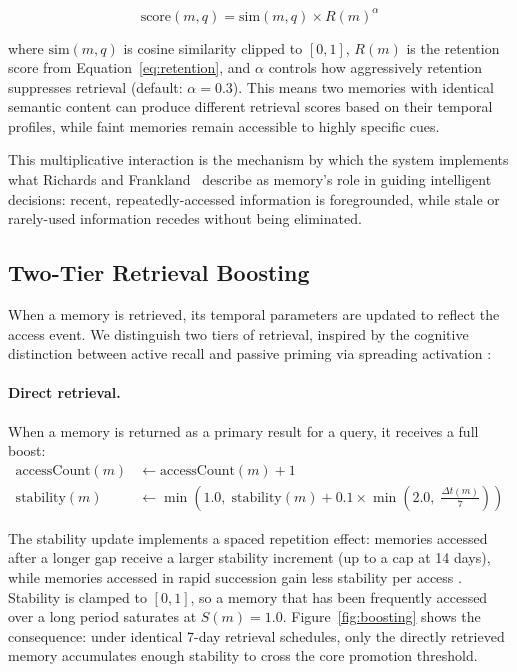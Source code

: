 \documentclass[11pt,a4paper]{article}
\begin{document}
\begin{equation}
\text{score}(m, q) = \text{sim}(m, q) \times R(m)^\alpha
\label{eq:score}
\end{equation}

\noindent where $\text{sim}(m, q)$ is cosine similarity clipped to $[0,1]$, $R(m)$ is the retention score from Equation~\ref{eq:retention}, and $\alpha$ controls how aggressively retention suppresses retrieval (default: $\alpha=0.3$). This means two memories with identical semantic content can produce different retrieval scores based on their temporal profiles, while faint memories remain accessible to highly specific cues.

This multiplicative interaction is the mechanism by which the system implements what Richards and Frankland~\citeyearpar{richards2017persistence} describe as memory's role in guiding intelligent decisions: recent, repeatedly-accessed information is foregrounded, while stale or rarely-used information recedes without being eliminated.

\subsection{Two-Tier Retrieval Boosting}
\label{sec:boost}

When a memory is retrieved, its temporal parameters are updated to reflect the access event. We distinguish two tiers of retrieval, inspired by the cognitive distinction between active recall and passive priming via spreading activation \citep{collins1975spreading}:

\paragraph{Direct retrieval.} When a memory is returned as a primary result for a query, it receives a full boost:
\begin{align}
\text{accessCount}(m) &\leftarrow \text{accessCount}(m) + 1 \\
\text{stability}(m) &\leftarrow \min\!\left(1.0,\; \text{stability}(m) + 0.1 \times \min\!\left(2.0,\; \frac{\Delta t(m)}{7}\right)\right)
\end{align}

The stability update implements a spaced repetition effect: memories accessed after a longer gap receive a larger stability increment (up to a cap at 14 days), while memories accessed in rapid succession gain less stability per access \citep{cepeda2006distributed}. Stability is clamped to $[0, 1]$, so a memory that has been frequently accessed over a long period saturates at $S(m) = 1.0$. Figure~\ref{fig:boosting} shows the consequence: under identical 7-day retrieval schedules, only the directly retrieved memory accumulates enough stability to cross the core promotion threshold.
\end{document}
